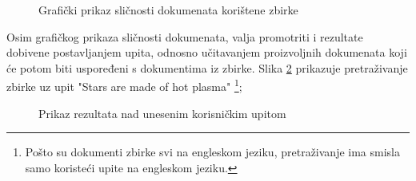\documentclass[times, utf8, zavrsni]{fer}
\begin{document}
\begin{figure}
\caption{Grafički prikaz sličnosti dokumenata korištene zbirke}
\label{img:turing}
\end{figure}

Osim grafičkog prikaza sličnosti dokumenata, valja promotriti i rezultate dobivene postavljanjem upita, odnosno učitavanjem proizvoljnih dokumenata koji će potom biti uspoređeni s dokumentima iz zbirke. Slika \ref{img:astronomy_query} prikazuje pretraživanje zbirke uz upit "Stars are made of hot plasma" \footnote{Pošto su dokumenti zbirke svi na engleskom jeziku, pretraživanje ima smisla samo koristeći upite na engleskom jeziku.};

\begin{figure}
\caption{Prikaz rezultata nad unesenim korisničkim upitom}
\label{img:astronomy_query}
\end{figure}
\end{document}
